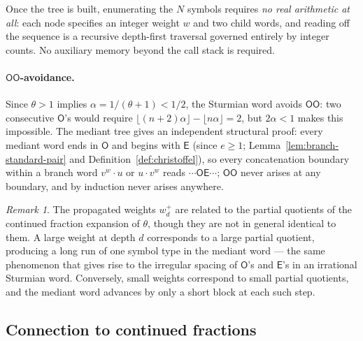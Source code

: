 \documentclass[12pt]{article}
\theoremstyle{definition}
\theoremstyle{remark}
\newtheorem{remark}[theorem]{Remark}
\theoremstyle{plain}
\newcommand{\OO}{\mathsf{O}}
\newcommand{\EE}{\mathsf{E}}
\begin{document}
Once the tree is built, enumerating the $N$ symbols requires \emph{no real
arithmetic at all}: each node specifies an integer weight $w$ and two child words,
and reading off the sequence is a recursive depth-first traversal governed entirely
by integer counts.
No auxiliary memory beyond the call stack is required.

\paragraph{$\OO\OO$-avoidance.}
Since $\theta > 1$ implies $\alpha = 1/(\theta+1) < 1/2$, the Sturmian word
avoids $\OO\OO$: two consecutive $\OO$'s would require
$\lfloor(n+2)\alpha\rfloor - \lfloor n\alpha\rfloor = 2$, but $2\alpha < 1$ makes
this impossible.
The mediant tree gives an independent structural proof: every mediant word ends in
$\OO$ and begins with $\EE$ (since $e \geq 1$; Lemma~\ref{lem:branch-standard-pair} and Definition~\ref{def:christoffel}), so every concatenation
boundary within a branch word $v^w \cdot u$ or $u \cdot v^w$ reads $\cdots\OO\EE\cdots$;
$\OO\OO$ never arises at any boundary, and by induction never arises anywhere.

\begin{remark}
The propagated weights $w^+_d$ are related to the partial quotients of the continued fraction
expansion of $\theta$, though they are not in general identical to them.
A large weight at depth $d$ corresponds to a large partial quotient, producing a long
run of one symbol type in the mediant word --- the same phenomenon that gives rise
to the irregular spacing of $\OO$'s and $\EE$'s in an irrational Sturmian word.
Conversely, small weights correspond to small partial quotients, and the mediant
word advances by only a short block at each such step.
\end{remark}

\subsection*{Connection to continued fractions}
\label{sec:cf-connection}
\end{document}
